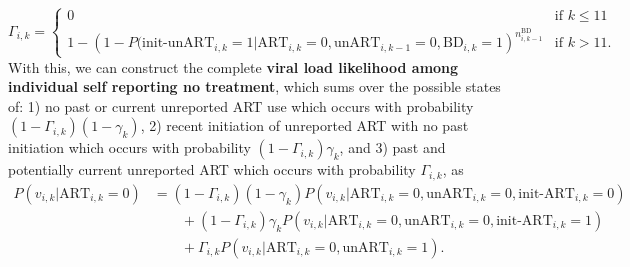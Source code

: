 \documentclass{article}[11pt]
\begin{document}
\begin{equation}
\Gamma_{i,k} = \begin{cases}
    0 & \text{if } k \leq 11 \\
    1 - \left(1 - P(\text{init-unART}_{i,k}=1|\text{ART}_{i,k}=0,\text{unART}_{i,k-1}=0, \text{BD}_{i,k}=1\right)^{n_{i,k-1}^\text{BD}} & \text{if } k > 11.
\end{cases}
\end{equation}
With this, we can construct the complete \textbf{viral load likelihood among individual self reporting no treatment}, which sums over the possible states of: 1) no past or current unreported ART use which occurs with probability $(1-\Gamma_{i,k})(1-\gamma_k)$, 2) recent initiation of unreported ART with no past initiation which occurs with probability $(1-\Gamma_{i,k})\gamma_k$, and 3) past and potentially current unreported ART which occurs with probability $\Gamma_{i,k}$, as
\begin{equation}
\begin{split}
P(v_{i,k}|\text{ART}_{i,k}=0) &= (1-\Gamma_{i,k})(1-\gamma_k) P(v_{i,k}|\text{ART}_{i,k}=0,\text{unART}_{i,k}=0, \text{init-ART}_{i,k}=0) \\
&\qquad +(1-\Gamma_{i,k})\gamma_kP(v_{i,k}|\text{ART}_{i,k}=0,\text{unART}_{i,k}=0, \text{init-ART}_{i,k}=1) \\
&\qquad +\Gamma_{i,k}P(v_{i,k}|\text{ART}_{i,k}=0, \text{unART}_{i,k}=1). \\
\end{split}
\end{equation}
\end{document}
